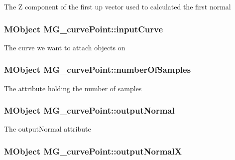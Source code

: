 The Z component of the first up vector used to calculated the first normal \hypertarget{class_m_g__curve_point_a466a5df04a399233b232242c869cd1ce}{
\subsubsection[{input\-Curve}]{\setlength{\rightskip}{0pt plus 5cm}M\-Object M\-G\-\_\-curve\-Point\-::input\-Curve\hspace{0.3cm}{\ttfamily [static]}}}\label{class_m_g__curve_point_a466a5df04a399233b232242c869cd1ce}
The curve we want to attach objects on \hypertarget{class_m_g__curve_point_aca4113084e81dbafd4cb383865af23d0}{
\subsubsection[{number\-Of\-Samples}]{\setlength{\rightskip}{0pt plus 5cm}M\-Object M\-G\-\_\-curve\-Point\-::number\-Of\-Samples\hspace{0.3cm}{\ttfamily [static]}}}\label{class_m_g__curve_point_aca4113084e81dbafd4cb383865af23d0}
The attribute holding the number of samples \hypertarget{class_m_g__curve_point_a6651bf21d34437f6920d5c31eba5e466}{
\subsubsection[{output\-Normal}]{\setlength{\rightskip}{0pt plus 5cm}M\-Object M\-G\-\_\-curve\-Point\-::output\-Normal\hspace{0.3cm}{\ttfamily [static]}}}\label{class_m_g__curve_point_a6651bf21d34437f6920d5c31eba5e466}
The output\-Normal attribute \hypertarget{class_m_g__curve_point_a44ac5cdd311c5faffc2c90664fefaa45}{
\subsubsection[{output\-Normal\-X}]{\setlength{\rightskip}{0pt plus 5cm}M\-Object M\-G\-\_\-curve\-Point\-::output\-Normal\-X\hspace{0.3cm}{\ttfamily [static]}}}\label{class_m_g__curve_point_a44ac5cdd311c5faffc2c90664fefaa45}
